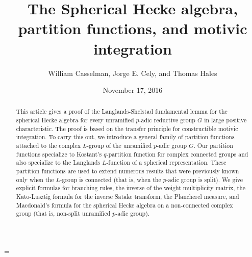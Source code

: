 \documentclass{amsart}
\theoremstyle{plain}
\theoremstyle{definition}
\theoremstyle{remark}
\numberwithin{equation}{subsection}
\begin{document}
\title
    {The Spherical Hecke algebra, partition functions, and motivic integration}
\author{William Casselman, Jorge E. Cely, and Thomas Hales}
\date{November 17, 2016}


\begin{abstract}   
This article gives a proof of the Langlands-Shelstad fundamental 
lemma for the spherical Hecke algebra
for every unramified $p$-adic reductive group $G$ in large positive 
characteristic.  The proof is based on the transfer principle
for constructible motivic integration.    To carry this out,
we introduce a general family of partition functions attached to 
the complex $L$-group of the unramified $p$-adic group $G$.
Our partition functions specialize to Kostant's $q$-partition 
function for complex connected groups and also 
specialize to the Langlands $L$-function of a spherical representation.
These partition functions are used to extend numerous 
results that were previously known only when the $L$-group is
connected (that is, when the $p$-adic group is split).
We give explicit formulas for branching rules, the inverse of the weight multiplicity matrix,
the Kato-Lusztig formula for the inverse Satake transform,
the Plancherel measure,  and Macdonald's formula for the spherical Hecke algebra on a
non-connected complex group (that is, non-split unramified $p$-adic group).  
\end{abstract}


\parskip=\baselineskip

 \maketitle



    

      
      
       
      
      
\end{document}
